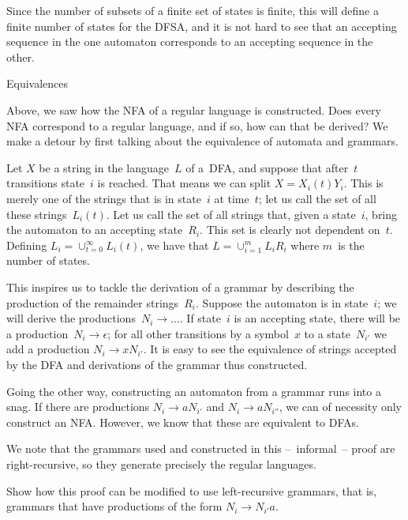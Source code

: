 Since the number of subsets of a finite set of states is finite, this
will define a finite number of states for the DFSA, and it is not hard
to see that an accepting sequence in the one automaton corresponds to
an accepting sequence in the other.

 {Equivalences}

Above, we saw how the NFA of a regular language is constructed. Does
every NFA correspond to a regular language, and if so, how can that be
derived? We make a detour by first talking about the equivalence of
automata and grammars.

Let $X$ be a string in the language~$L$ of a~DFA, and suppose
that after~$t$ transitions state~$i$ is reached. That means we can
split $X=X_i(t)Y_i$. This is merely one of the strings that is in
state~$i$ at time~$t$; let us call the set of all these
strings~$L_i(t)$. Let us call the set of all strings that, given a
state~$i$, bring the automaton to an accepting state~$R_i$. This set
is clearly not dependent on~$t$. Defining $L_i=\cup_{t=0}^\infty
L_i(t)$, we have that $L=\cup_{i=1}^m L_iR_i$ where $m$~is the number
of states.

This inspires us to tackle the derivation of a grammar by describing
the production of the  remainder strings~$R_i$. Suppose the automaton
is in state~$i$; we will derive the productions~$N_i\rightarrow\dots$.
If state~$i$ is an accepting state, there will be a
production~$N_i\rightarrow\epsilon$; for all other transitions by a
symbol~$x$ to a state~$N_{i'}$ we add a production $N_i\rightarrow
xN_{i'}$. It is easy to see the equivalence of strings accepted by the
DFA and derivations of the grammar thus constructed.

Going the other way, constructing an automaton from a grammar runs
into a snag. If there are productions $N_i\rightarrow aN_{i'}$ and
$N_i\rightarrow aN_{i''}$, we can of necessity only construct an
NFA. However, we know that these are equivalent to DFAs.

We note that the grammars used and constructed in this --~informal~--
proof are right-recursive, so they generate precisely the regular
languages.

\begin{594exercise}
Show how this proof can be modified to use left-recursive grammars,
that is, grammars that have productions of the form $N_i\rightarrow
N_{i'}a$.
\end{594exercise}

\begin{comment}
\Level 1 {Normal form}

Normal form of regular languages, proof of equivalence
\end{comment}

